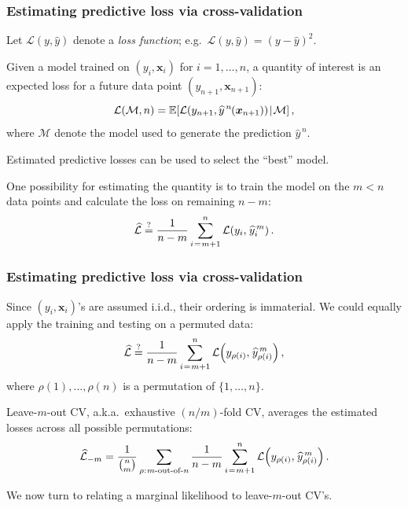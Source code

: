 \documentclass[18pt]{beamer}
\newcommand{\defineTightSpacing}{%
	\setlength{\abovedisplayskip}{.25\baselineskip}%
	\setlength{\belowdisplayskip}{.25\baselineskip}%
}
\renewcommand{\textsc}[1]{{\small \MakeUppercase{#1}}}
\newcommand{\given}{\thinnerspace | \thinnerspace}
\newcommand{\spacedColon}{\mkern .5mu : \mkern 1mu}
\newcommand{\thinnerspace}{\mskip.5\thinmuskip}
\newcommand{\expectation}{\mathbb{E}}
\newcommand{\bx}{\bm{x}}
\newcommand{\loss}{\mathcal{L}}
\newcommand{\modelSymbol}{\mathcal{M}}
\newcommand{\permutation}{\rho}
\newcommand{\trainingSize}{m}
\newcommand{\testSampleIndex}{i}
\newcommand{\testOutcome}{y_{\permutation(\testSampleIndex)}} %
\newcommand{\testOutcomePredicted}{\widehat{y}_{\permutation(\testSampleIndex)}^{\, \trainingSize}}
\begin{document}
\begin{frame}
\frametitle{Estimating predictive loss via cross-validation}
Let $\loss(y, \widehat{y})$ denote a \textit{loss function}; e.g.\ $\loss(y, \widehat{y}) = (y - \widehat{y})^2$.

\pause
\smallskip
Given a model trained on $(y_i, \bx_i)$ for $i = 1, \ldots, n$, a quantity of interest is an expected loss for a future data point $(y_{n + 1}, \bx_{n + 1})$:
\begin{equation*} \defineTightSpacing%
\loss(\modelSymbol, n)
= \expectation\!\left[
	\loss(y_{n + 1}, \widehat{y}^{\, n}\mkern-1mu(\bx_{n + 1}))
	\given \modelSymbol
\right],
\end{equation*}
where $\modelSymbol$ denote the model used to generate the prediction $\widehat{y}^{\, n}$.

\pause
\smallskip
Estimated predictive losses can be used to select the ``best'' model.

\pause
\smallskip
One possibility for estimating the quantity is to train the model on the $\trainingSize < n$ data points and calculate the loss on remaining $n - \trainingSize$:
\begin{equation*} \defineTightSpacing%
\widehat{\loss} \overset{?}{=}
	\frac{1}{n - \trainingSize}\sum_{\testSampleIndex \thinnerspace = \thinnerspace \trainingSize + 1}^n
	\loss\!\left(
		y_i, \thinnerspace \widehat{y}_{\testSampleIndex}^{\, \trainingSize}
	\right).
\end{equation*}
\end{frame}


\begin{frame}
\frametitle{Estimating predictive loss via cross-validation}
Since $(y_i, \bx_i)$'s are assumed i.i.d., their ordering is immaterial. 
We could equally apply the training and testing on a permuted data:
\begin{equation*} \defineTightSpacing%
\widehat{\loss} \overset{?}{=}
	\frac{1}{n - \trainingSize}\sum_{\testSampleIndex \thinnerspace = \thinnerspace \trainingSize + 1}^n
	\loss\!\left(
		\testOutcome, \thinnerspace \testOutcomePredicted
	\right),
\end{equation*}
where $\permutation(1), \ldots, \permutation(n)$ is a permutation of $\{ 1, \ldots, n\}$. 

\pause
\smallskip
Leave-$\trainingSize$-out \textsc{CV}, a.k.a.\ exhaustive $(n / \trainingSize)$-fold \textsc{CV}, averages the estimated losses across all possible permutations:
\begin{equation*} \defineTightSpacing%
\widehat{\loss}_{-\trainingSize} =
	\frac{1}{{n \choose \trainingSize}} \sum_{\permutation \spacedColon \text{$\trainingSize$-out-of-$n$}}
	\frac{1}{n - \trainingSize}\sum_{\testSampleIndex \thinnerspace = \thinnerspace \trainingSize + 1}^n
	\loss\!\left(
		\testOutcome, \thinnerspace \testOutcomePredicted
	\right).
\end{equation*}

\pause
\smallskip
We now turn to relating a marginal likelihood to leave-$\trainingSize$-out \textsc{CV}'s.
\end{frame}
\end{document}
